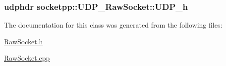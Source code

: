 \hypertarget{classsocketpp_1_1UDP__RawSocket_fbdcc519279aec772f575237ca25f783}{
\subsubsection[{UDP\_\-h}]{\setlength{\rightskip}{0pt plus 5cm}udphdr {\bf socketpp::UDP\_\-RawSocket::UDP\_\-h}}}
\label{classsocketpp_1_1UDP__RawSocket_fbdcc519279aec772f575237ca25f783}




The documentation for this class was generated from the following files:\begin{CompactItemize}
\item 
\hyperlink{RawSocket_8h}{RawSocket.h}\item 
\hyperlink{RawSocket_8cpp}{RawSocket.cpp}\end{CompactItemize}
